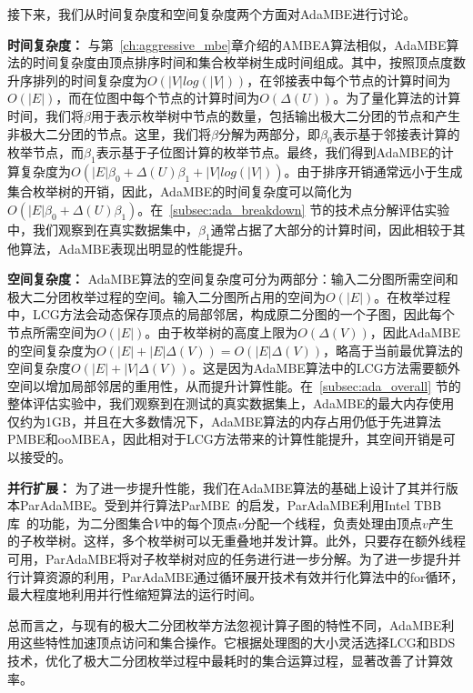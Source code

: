 接下来，我们从时间复杂度和空间复杂度两个方面对AdaMBE进行讨论。

\textbf{时间复杂度：} 与第~\ref{ch:aggressive_mbe}章介绍的AMBEA算法相似，AdaMBE算法的时间复杂度由顶点排序时间和集合枚举树生成时间组成。其中，按照顶点度数升序排列的时间复杂度为$O(|V|log(|V|))$，在邻接表中每个节点的计算时间为$O(|E|)$，而在位图中每个节点的计算时间为$O(\Delta(U))$。为了量化算法的计算时间，我们将$\beta$用于表示枚举树中节点的数量，包括输出极大二分团的节点和产生非极大二分团的节点。这里，我们将$\beta$分解为两部分，即$\beta_0$表示基于邻接表计算的枚举节点，而$\beta_1$表示基于子位图计算的枚举节点。最终，我们得到AdaMBE的计算复杂度为$O(|E|\beta_0 + \Delta(U)\beta_1 + |V|log(|V|))$。由于排序开销通常远小于生成集合枚举树的开销，因此，AdaMBE的时间复杂度可以简化为$O(|E|\beta_0 + \Delta(U)\beta_1 )$。在~\ref{subsec:ada_breakdown} 节的技术点分解评估实验中，我们观察到在真实数据集中，$\beta_1$通常占据了大部分的计算时间，因此相较于其他算法，AdaMBE表现出明显的性能提升。

\textbf{空间复杂度：} AdaMBE算法的空间复杂度可分为两部分：输入二分图所需空间和极大二分团枚举过程的空间。输入二分图所占用的空间为$O(|E|)$。在枚举过程中，LCG方法会动态保存顶点的局部邻居，构成原二分图的一个子图，因此每个节点所需空间为$O(|E|)$。由于枚举树的高度上限为$O(\Delta(V))$，因此AdaMBE的空间复杂度为$O(|E|+|E|\Delta(V)) = O(|E|\Delta(V))$，略高于当前最优算法的空间复杂度$O(|E|+|V|\Delta(V))$。这是因为AdaMBE算法中的LCG方法需要额外空间以增加局部邻居的重用性，从而提升计算性能。在~\ref{subsec:ada_overall} 节的整体评估实验中，我们观察到在测试的真实数据集上，AdaMBE的最大内存使用仅约为1GB，并且在大多数情况下，AdaMBE算法的内存占用仍低于先进算法PMBE和ooMBEA，因此相对于LCG方法带来的计算性能提升，其空间开销是可以接受的。

\textbf{并行扩展：} 为了进一步提升性能，我们在AdaMBE算法的基础上设计了其并行版本ParAdaMBE。受到并行算法ParMBE~\cite{parMBE19}的启发，ParAdaMBE利用Intel TBB库~\cite{tbb-code}的功能，为二分图集合$V$中的每个顶点$v$分配一个线程，负责处理由顶点$v$产生的子枚举树。这样，多个枚举树可以无重叠地并发计算。此外，只要存在额外线程可用，ParAdaMBE将对子枚举树对应的任务进行进一步分解。为了进一步提升并行计算资源的利用，ParAdaMBE通过循环展开技术有效并行化算法中的for循环，最大程度地利用并行性缩短算法的运行时间。

总而言之，与现有的极大二分团枚举方法忽视计算子图的特性不同，AdaMBE利用这些特性加速顶点访问和集合操作。它根据处理图的大小灵活选择LCG和BDS技术，优化了极大二分团枚举过程中最耗时的集合运算过程，显著改善了计算效率。



